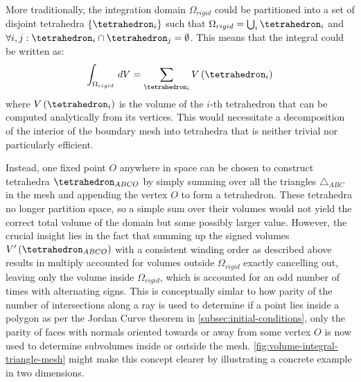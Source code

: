 \documentclass[oneside, a4paper]{book}
\newcommand\br[1]{\left(#1\right)}
\begin{document}
  More traditionally, the integration domain $\Omega_{rigid}$ could be partitioned into a set of disjoint tetrahedra $\{\tetrahedron_i\}$ such that $\Omega_{rigid} = \bigcup_i \tetrahedron_i$ and $\forall i,j: \tetrahedron_i \cap \tetrahedron_j = \emptyset$. This means that the integral could be written as:
  \begin{equation}
    \int_{\Omega_{rigid}} \,dV = \sum_{\tetrahedron_i} V\br{\tetrahedron_i}
  \end{equation} where $V\br{\tetrahedron_i}$ is the volume of the $i$-th tetrahedron that can be computed analytically from its vertices. This would necessitate a decomposition of the interior of the boundary mesh into tetrahedra that is neither trivial nor particularly efficient. 
  
  Instead, one fixed point $O$ anywhere in space can be chosen to construct tetrahedra $\tetrahedron_{ABCO}$ by simply summing over all the triangles $\triangle_{ABC}$ in the mesh and appending the vertex $O$ to form a tetrahedron. These tetrahedra no longer partition space, so a simple sum over their volumes would not yield the correct total volume of the domain but some possibly larger value. However, the crucial insight lies in the fact that summing up the signed volumes $V'\br{\tetrahedron_{ABCO}}$ with a consistent winding order as described above results in multiply accounted for volumes outside $\Omega_{rigid}$ exactly cancelling out, leaving only the volume inside $\Omega_{rigid}$, which is accounted for an odd number of times with alternating signs. This is conceptually simlar to how parity of the number of intersections along a ray is used to determine if a point lies inside a polygon as per the Jordan Curve theorem in \autoref{subsec:initial-conditions}, only the parity of faces with normals oriented towards or away from some vertex $O$ is now used to determine subvolumes inside or outside the mesh. \autoref{fig:volume-integral-triangle-mesh} might make this concept clearer by illustrating a concrete example in two dimensions. 
  
\end{document}
